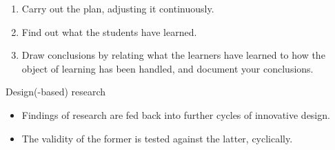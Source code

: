 \begin{frame}
  \begin{example}
    \begin{enumerate}
      \resumeenumi
      \item<+> Carry out the plan, adjusting it continuously.
      \item<+> Find out what the students have learned.
      \item<+> Draw conclusions by relating what the learners have learned to 
        how the object of learning has been handled, and document your 
        conclusions.
    \end{enumerate}
  \end{example}
\end{frame}

\begin{frame}
  \begin{block}{Design(-based) 
    research~{\cite[p.~259]{NecessaryConditionsOfLearning}}}
    \begin{itemize}
      \item Findings of research are fed back into further cycles of innovative 
        design.
      \item The validity of the former is tested against the latter, 
        cyclically.
    \end{itemize}
  \end{block}
\end{frame}

